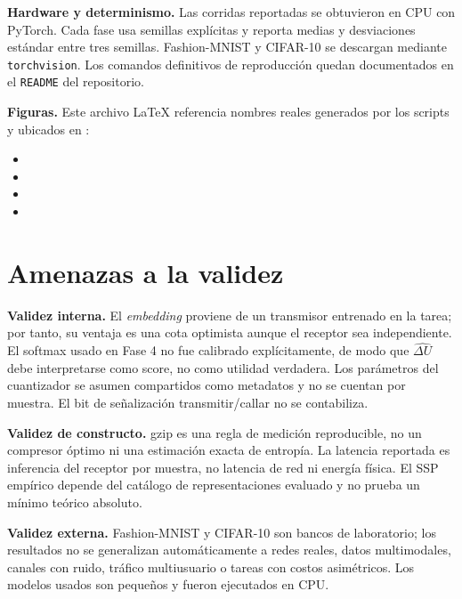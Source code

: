 \textbf{Hardware y determinismo.} Las corridas reportadas se obtuvieron en CPU con PyTorch. Cada fase usa semillas expl\'icitas y reporta medias y desviaciones est\'andar entre tres semillas. Fashion-MNIST y CIFAR-10 se descargan mediante \texttt{torchvision}. Los comandos definitivos de reproducci\'on quedan documentados en el \texttt{README} del repositorio.

\textbf{Figuras.} Este archivo LaTeX referencia nombres reales generados por los scripts y ubicados en :
\begin{itemize}[leftmargin=1.4em,itemsep=1pt,topsep=2pt]
\item {}
\item {}
\item {}
\item {}
\end{itemize}

\section{Amenazas a la validez}

\textbf{Validez interna.} El \emph{embedding} proviene de un transmisor entrenado en la tarea; por tanto, su ventaja es una cota optimista aunque el receptor sea independiente. El softmax usado en Fase 4 no fue calibrado expl\'icitamente, de modo que $\widehat{\Delta U}$ debe interpretarse como score, no como utilidad verdadera. Los par\'ametros del cuantizador se asumen compartidos como metadatos y no se cuentan por muestra. El bit de se\~nalizaci\'on transmitir/callar no se contabiliza.

\textbf{Validez de constructo.} gzip es una regla de medici\'on reproducible, no un compresor \'optimo ni una estimaci\'on exacta de entrop\'ia. La latencia reportada es inferencia del receptor por muestra, no latencia de red ni energ\'ia f\'isica. El SSP emp\'irico depende del cat\'alogo de representaciones evaluado y no prueba un m\'inimo te\'orico absoluto.

\textbf{Validez externa.} Fashion-MNIST y CIFAR-10 son bancos de laboratorio; los resultados no se generalizan autom\'aticamente a redes reales, datos multimodales, canales con ruido, tr\'afico multiusuario o tareas con costos asim\'etricos. Los modelos usados son peque\~nos y fueron ejecutados en CPU.

